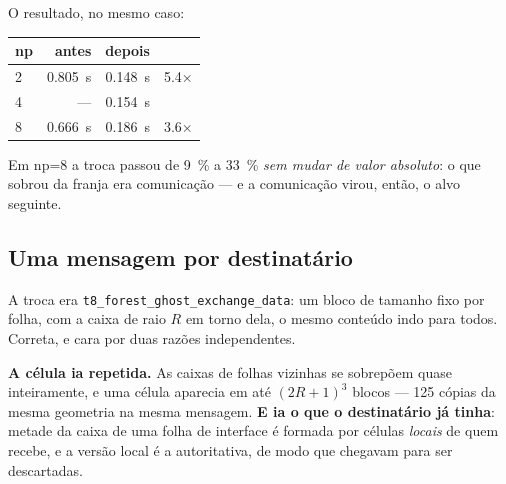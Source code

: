 
O resultado, no mesmo caso:

\begin{center}
\begin{tabular}{lrrr}
\toprule
np & antes & depois & \\
\midrule
2 & \SI{0.805}{\second} & \SI{0.148}{\second} & \num{5.4}$\times$ \\
4 & --- & \SI{0.154}{\second} & \\
8 & \SI{0.666}{\second} & \SI{0.186}{\second} & \num{3.6}$\times$ \\
\bottomrule
\end{tabular}
\end{center}

Em np=8 a troca passou de \SI{9}{\percent} a \SI{33}{\percent} \emph{sem mudar
de valor absoluto}: o que sobrou da franja era comunicação --- e a comunicação
virou, então, o alvo seguinte.

\subsection{Uma mensagem por destinatário}
\label{sec:par-mensagem}

A troca era \texttt{t8\_forest\_ghost\_exchange\_data}: um bloco de tamanho
fixo por folha, com a caixa de raio $R$ em torno dela, o mesmo conteúdo indo
para todos. Correta, e cara por duas razões independentes.

\textbf{A célula ia repetida.} As caixas de folhas vizinhas se sobrepõem quase
inteiramente, e uma célula aparecia em até $(2R+1)^3$ blocos --- 125 cópias da
mesma geometria na mesma mensagem. \textbf{E ia o que o destinatário já tinha}:
metade da caixa de uma folha de interface é formada por células \emph{locais}
de quem recebe, e a versão local é a autoritativa, de modo que chegavam para ser
descartadas.

